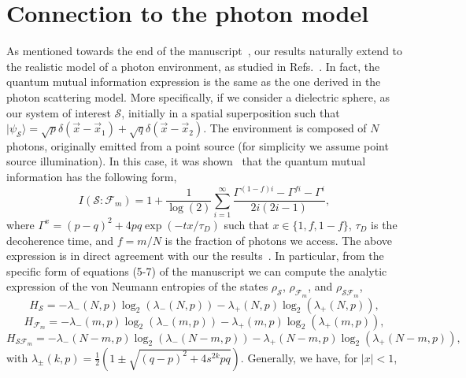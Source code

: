 \documentclass[aps,prl,showpacs,amsmath,amssymb,amsfonts,lengthcheck,onecolumn,longbibliography,superscriptaddress]{revtex4-2}
\newcommand{\+}         {\dagger}
\newcommand{\mc}[1]{\mathcal{#1}}
\begin{document}
\section{Connection to the photon model}
As mentioned towards the end of the manuscript~\cite{darwint1}, our results naturally extend to the realistic model of a photon environment, as studied in Refs.~\cite{Riedel2010PRL,Riedel2011NJP}. In fact, the quantum mutual information expression is the same as the one derived in the photon scattering model. More specifically, if we consider a dielectric sphere, as our system of interest $\mc{S}$, initially in a spatial superposition such that $| \psi_{\mc{S}} \rangle =\sqrt{p} \delta\left(\vec{x}-\vec{x}_{1}\right)+\sqrt{q} \delta\left(\vec{x}-\vec{x}_{2}\right)$. The environment is composed of $N$ photons, originally emitted from a point source (for simplicity we assume point source illumination). In this case, it was shown~\cite{Riedel2010PRL,Riedel2011NJP} that the quantum mutual information has the following form,
\begin{equation}
	I (\mathcal{S}: \mathcal{F}_m)=1+\frac{1}{\log(2)}\sum_{i=1}^{\infty} \frac{\Gamma^{(1-f) i}-\Gamma^{f i}-\Gamma^{i}}{2 i(2 i-1)},
	\label{phot}
\end{equation}
where $\Gamma^{x}= (p-q)^{2}+4pq \exp(-tx/\tau_D)$ such that $x \in \{1,f,1-f\}$, $\tau_D$ is the decoherence time, and $f=m/N$ is the fraction of photons we access. The above expression is in direct agreement with our the results~\cite{darwint1}. In particular, from the specific form of equations (5-7) of the manuscript we can compute the analytic expression of the von Neumann entropies of the states $\rho_{\mc{S}}$, $\rho_{\mc{F}_m}$, and $\rho_{\mc{S}\mc{F}_m}$,
\begin{equation}
	H_{\mc{S}}=-\lambda_{-}\left(N, p\right) \log_{2} \left(\lambda_{-}(N,p)\right)-\lambda_{+}(N,p) \log_{2} \left(\lambda_{+}(N,p)\right),
\end{equation}
\begin{equation}
	H_{\mc{F}_m}=-\lambda_{-}(m,p) \log_{2} \left(\lambda_{-}(m,p)\right)-\lambda_{+}(m,p) \log_{2} \left(\lambda_{+}(m,p)\right),
\end{equation}
\begin{equation}
	H_{\mc{S}\mc{F}_m}=-\lambda_{-}(N-m,p) \log_{2} \left(\lambda_{-}(N-m,p)\right)-\lambda_{+}(N-m,p) \log_{2} \left(\lambda_{+}(N-m,p)\right),
\end{equation}
with $\lambda_{\pm}(k,p)=\frac{1}{2}\left(1 \pm \sqrt{\left(q-p\right)^{2}+4s^{2k}pq}\right)$. Generally, we have, for $|x|<1$,
\end{document}
